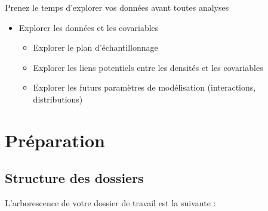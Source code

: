 \documentclass[french,a4paper]{article}
\providecommand{\tightlist}{%
  \setlength{\itemsep}{0pt}\setlength{\parskip}{0pt}}
\begin{document}
\nopandoc{\begin{redbox}}

Prenez le temps d'explorer vos données avant toutes analyses
\nopandoc{\end{redbox}}

\begin{itemize}
\tightlist
\item
  Explorer les données et les covariables

  \begin{itemize}
  \tightlist
  \item
    Explorer le plan d'échantillonnage
  \item
    Explorer les liens potentiels entre les densités et les covariables
  \item
    Explorer les futurs paramètres de modélisation (interactions, distributions)
  \end{itemize}
\end{itemize}



\hypertarget{preparation}{%
\section{Préparation}\label{preparation}}

\hypertarget{structure-des-dossiers}{%
\subsection{Structure des dossiers}\label{structure-des-dossiers}}


L'arborescence de votre dossier de travail est la suivante :
\end{document}
